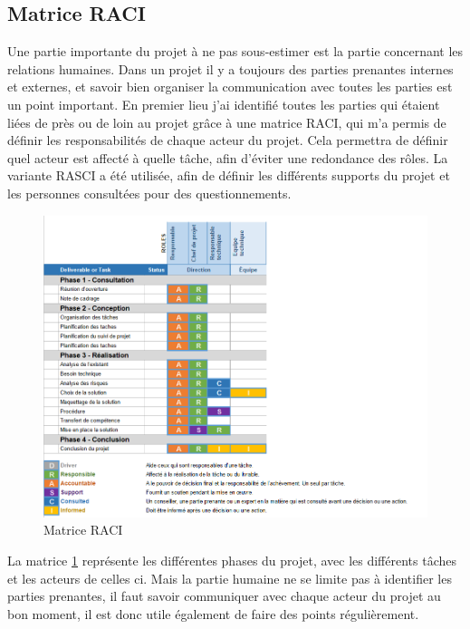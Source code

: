 \documentclass[pfe]{tnreport} %
\begin{document}
\subsection{Matrice RACI}

Une partie importante du projet à ne pas sous-estimer est la partie concernant les relations humaines. Dans 
un projet il y a toujours des parties prenantes internes et externes, et savoir bien organiser la 
communication avec toutes les parties est un point important. En premier lieu j’ai identifié toutes les 
parties qui étaient liées de près ou de loin au projet grâce à une matrice RACI, qui m’a permis de définir 
les responsabilités de chaque acteur du projet. Cela permettra de définir quel acteur est affecté à quelle tâche, afin d'éviter une redondance des rôles. \newline
La variante RASCI a été utilisée, afin de définir les différents supports du projet et les personnes consultées pour des questionnements.

\begin{figure}[ht]
 \centering
 \includegraphics[width=18cm]{figures/raci.png}
 \caption{Matrice RACI}
 \label{fig:raci}
\end{figure}

La matrice \ref{fig:raci} représente les différentes phases du projet, avec les différents tâches et les acteurs de celles ci. \newline
Mais la partie humaine ne se limite pas à identifier les parties prenantes, il faut savoir communiquer avec chaque acteur du projet au bon moment, il est donc utile également de faire des points régulièrement.
\end{document}
